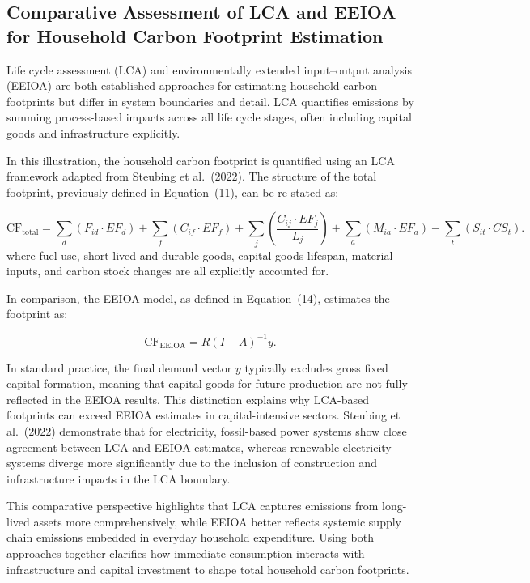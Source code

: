 \documentclass[12pt,a4paper]{article}%
\begin{document}
\subsection{Comparative Assessment of LCA and EEIOA for Household Carbon Footprint Estimation}

Life cycle assessment (LCA) and environmentally extended input--output analysis (EEIOA) are both established approaches for estimating household carbon footprints but differ in system boundaries and detail. LCA quantifies emissions by summing process-based impacts across all life cycle stages, often including capital goods and infrastructure explicitly.

In this illustration, the household carbon footprint is quantified using an LCA framework adapted from Steubing et al.~(2022). The structure of the total footprint, previously defined in Equation~(11), can be re-stated as:

\begin{equation}
\text{CF}_{\text{total}} = \sum_d (F_{id} \cdot EF_d) 
+ \sum_f (C_{if} \cdot EF_f) 
+ \sum_j \left( \frac{C_{ij} \cdot EF_j}{L_j} \right)
+ \sum_a (M_{ia} \cdot EF_a)
- \sum_t (S_{it} \cdot CS_t).
\end{equation}
where fuel use, short-lived and durable goods, capital goods lifespan, material inputs, and carbon stock changes are all explicitly accounted for.

In comparison, the EEIOA model, as defined in Equation~(14), estimates the footprint as:

\begin{equation}
\text{CF}_{\text{EEIOA}} = {R (I - A)}^{-1} y.
\end{equation}

In standard practice, the final demand vector $y$ typically excludes gross fixed capital formation, meaning that capital goods for future production are not fully reflected in the EEIOA results. This distinction explains why LCA-based footprints can exceed EEIOA estimates in capital-intensive sectors. Steubing et al.~(2022) demonstrate that for electricity, fossil-based power systems show close agreement between LCA and EEIOA estimates, whereas renewable electricity systems diverge more significantly due to the inclusion of construction and infrastructure impacts in the LCA boundary.

This comparative perspective highlights that LCA captures emissions from long-lived assets more comprehensively, while EEIOA better reflects systemic supply chain emissions embedded in everyday household expenditure. Using both approaches together clarifies how immediate consumption interacts with infrastructure and capital investment to shape total household carbon footprints.
\end{document}
